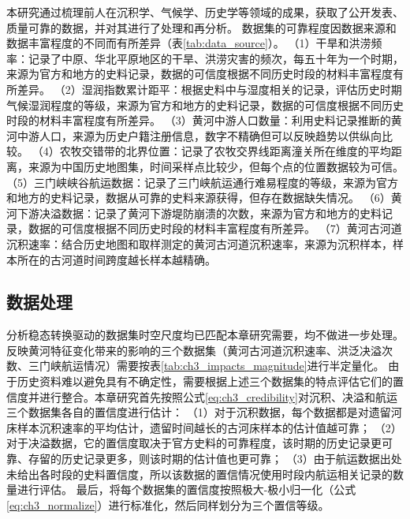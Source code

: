 本研究通过梳理前人在沉积学、气候学、历史学等领域的成果，获取了公开发表、质量可靠的数据，并对其进行了处理和再分析。
数据集的可靠程度因数据来源和数据丰富程度的不同而有所差异（表\ref{tab:data_source}）。
（1）干旱和洪涝频率：记录了中原、华北平原地区的干旱、洪涝灾害的频次，每五十年为一个时期，来源为官方和地方的史料记录，数据的可信度根据不同历史时段的材料丰富程度有所差异。
（2）湿润指数累计距平：根据史料中与湿度相关的记录，评估历史时期气候湿润程度的等级，来源为官方和地方的史料记录，数据的可信度根据不同历史时段的材料丰富程度有所差异。
（3）黄河中游人口数量：利用史料记录推断的黄河中游人口，来源为历史户籍注册信息，数字不精确但可以反映趋势以供纵向比较。
（4）农牧交错带的北界位置：记录了农牧交界线距离潼关所在维度的平均距离，来源为中国历史地图集，时间采样点比较少，但每个点的位置数据较为可信。
（5）三门峡峡谷航运数据：记录了三门峡航运通行难易程度的等级，来源为官方和地方的史料记录，数据从可靠的史料来源获得，但存在数据缺失情况。
（6）黄河下游决溢数据：记录了黄河下游堤防崩溃的次数，来源为官方和地方的史料记录，数据的可信度根据不同历史时段的材料丰富程度有所差异。
（7）黄河古河道沉积速率：结合历史地图和取样测定的黄河古河道沉积速率，来源为沉积样本，样本所在的古河道时间跨度越长样本越精确。



\subsection{数据处理}

分析稳态转换驱动的数据集时空尺度均已匹配本章研究需要，均不做进一步处理。
反映黄河特征变化带来的影响的三个数据集（黄河古河道沉积速率、洪泛决溢次数、三门峡航运情况）需要按表\ref{tab:ch3_impacts_magnitude}进行半定量化。
由于历史资料难以避免具有不确定性，需要根据上述三个数据集的特点评估它们的置信度并进行整合。本章研究首先按照公式\ref{eq:ch3_credibility}对沉积、决溢和航运三个数据集各自的置信度进行估计：
（1）对于沉积数据，每个数据都是对遗留河床样本沉积速率的平均估计，遗留时间越长的古河床样本的估计值越可靠；
（2）对于决溢数据，它的置信度取决于官方史料的可靠程度，该时期的历史记录更可靠、存留的历史记录更多，则该时期的估计值也更可靠；
（3）由于航运数据出处未给出各时段的史料置信度，所以该数据的置信情况使用时段内航运相关记录的数量进行评估。
最后，将每个数据集的置信度按照极大-极小归一化（公式\ref{eq:ch3_normalize}）进行标准化，然后同样划分为三个置信等级。

